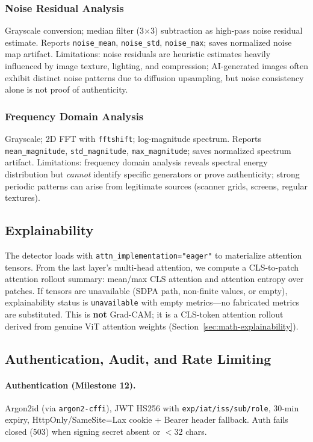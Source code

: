 \documentclass[10pt,conference,compsoc]{IEEEtran}
\begin{document}
\subsubsection{Noise Residual Analysis}
Grayscale conversion; median filter (3$\times$3) subtraction as high-pass noise residual estimate.
Reports \texttt{noise\_mean}, \texttt{noise\_std}, \texttt{noise\_max}; saves normalized noise map artifact.
Limitations: noise residuals are heuristic estimates heavily influenced by image texture, lighting, and compression; AI-generated images often exhibit distinct noise patterns due to diffusion upsampling, but noise consistency alone is not proof of authenticity.

\subsubsection{Frequency Domain Analysis}
Grayscale; 2D FFT with \texttt{fftshift}; log-magnitude spectrum.
Reports \texttt{mean\_magnitude}, \texttt{std\_magnitude}, \texttt{max\_magnitude}; saves normalized spectrum artifact.
Limitations: frequency domain analysis reveals spectral energy distribution but \emph{cannot} identify specific generators or prove authenticity; strong periodic patterns can arise from legitimate sources (scanner grids, screens, regular textures).

\subsection{Explainability}
\label{sec:explainability}

The detector loads with \texttt{attn\_implementation="eager"} to materialize attention tensors.
From the last layer's multi-head attention, we compute a CLS-to-patch attention rollout summary:
mean/max CLS attention and attention entropy over patches.
If tensors are unavailable (SDPA path, non-finite values, or empty), explainability status is \texttt{unavailable} with empty metrics—no fabricated metrics are substituted.
This is \textbf{not} Grad-CAM; it is a CLS-token attention rollout derived from genuine ViT attention weights (Section~\ref{sec:math-explainability}).

\subsection{Authentication, Audit, and Rate Limiting}
\label{sec:auth-audit}

\paragraph{Authentication (Milestone 12).} Argon2id (via \texttt{argon2-cffi}), JWT HS256 with \texttt{exp/iat/iss/sub/role}, 30-min expiry, HttpOnly/SameSite=Lax cookie + Bearer header fallback. Auth fails closed (503) when signing secret absent or $<$32 chars.
\end{document}
